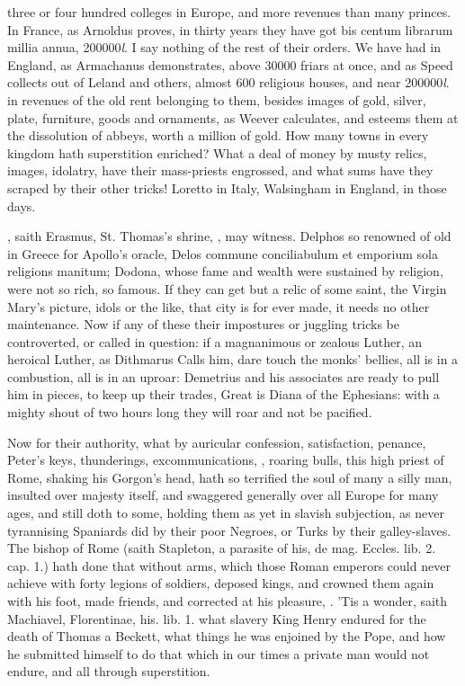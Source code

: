 {three or four hundred colleges in Europe, and more revenues than many
princes. In France, as Arnoldus proves, in thirty years they have got
bis centum librarum millia annua, 200\thinspace{}000\emph{l}. I say nothing of the rest
of their orders. We have had in England, as Armachanus demonstrates,
above 30\thinspace{}000 friars at once, and as Speed collects out of Leland
and others, almost 600 religious houses, and near 200\thinspace{}000\emph{l}. in
revenues of the old rent belonging to them, besides images of gold,
silver, plate, furniture, goods and ornaments, as Weever
calculates, and esteems them at the dissolution of abbeys, worth a
million of gold. How many towns in every kingdom hath superstition
enriched? What a deal of money by musty relics, images, idolatry, have
their mass-priests engrossed, and what sums have they scraped by their
other tricks! Loretto in Italy, Walsingham in England, in those days.

, saith
Erasmus, St. Thomas's shrine, \etc{}, may witness. Delphos so
renowned of old in Greece for Apollo's oracle, Delos commune
conciliabulum et emporium sola religions manitum; Dodona, whose fame
and wealth were sustained by religion, were not so rich, so famous. If
they can get but a relic of some saint, the Virgin Mary's picture,
idols or the like, that city is for ever made, it needs no other
maintenance. Now if any of these their impostures or juggling tricks be
controverted, or called in question: if a magnanimous or zealous
Luther, an heroical Luther, as Dithmarus Calls him, dare touch
the monks' bellies, all is in a combustion, all is in an uproar:
Demetrius and his associates are ready to pull him in pieces, to keep
up their trades,  Great is Diana of the Ephesians: with a mighty
shout of two hours long they will roar and not be pacified.

Now for their authority, what by auricular confession, satisfaction,
penance, Peter's keys, thunderings, excommunications, \etc{}, roaring
bulls, this high priest of Rome, shaking his Gorgon's head, hath so
terrified the soul of many a silly man, insulted over majesty itself,
and swaggered generally over all Europe for many ages, and still doth
to some, holding them as yet in slavish subjection, as never
tyrannising Spaniards did by their poor Negroes, or Turks by their
galley-slaves. The bishop of Rome (saith Stapleton, a parasite of
his, de mag. Eccles. lib. 2. cap. 1.) hath done that without arms,
which those Roman emperors could never achieve with forty legions of
soldiers, deposed kings, and crowned them again with his foot, made
friends, and corrected at his pleasure, \etc{}.  'Tis a wonder, saith
Machiavel, Florentinae, his. lib. 1. what slavery King Henry 
endured for the death of Thomas a Beckett, what things he was enjoined
by the Pope, and how he submitted himself to do that which in our times
a private man would not endure, and all through superstition.

}
